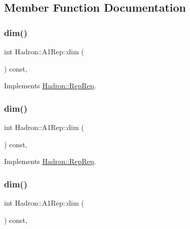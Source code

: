 \subsection{Member Function Documentation}
\mbox{\label{structHadron_1_1A1Rep_a4f7f61f8c9a5113c9407be6609cf7fbe}} 
\subsubsection{\texorpdfstring{dim()}{dim()}\hspace{0.1cm}{\footnotesize\ttfamily [1/5]}}
{\footnotesize\ttfamily int Hadron\+::\+A1\+Rep\+::dim (\begin{DoxyParamCaption}{ }\end{DoxyParamCaption}) const\hspace{0.3cm}{\ttfamily [inline]}, {\ttfamily [virtual]}}



Implements \mbox{\hyperlink{structHadron_1_1RepRep_a92c8802e5ed7afd7da43ccfd5b7cd92b}{Hadron\+::\+Rep\+Rep}}.

\mbox{\label{structHadron_1_1A1Rep_a4f7f61f8c9a5113c9407be6609cf7fbe}} 
\subsubsection{\texorpdfstring{dim()}{dim()}\hspace{0.1cm}{\footnotesize\ttfamily [2/5]}}
{\footnotesize\ttfamily int Hadron\+::\+A1\+Rep\+::dim (\begin{DoxyParamCaption}{ }\end{DoxyParamCaption}) const\hspace{0.3cm}{\ttfamily [inline]}, {\ttfamily [virtual]}}



Implements \mbox{\hyperlink{structHadron_1_1RepRep_a92c8802e5ed7afd7da43ccfd5b7cd92b}{Hadron\+::\+Rep\+Rep}}.

\mbox{\label{structHadron_1_1A1Rep_a4f7f61f8c9a5113c9407be6609cf7fbe}} 
\subsubsection{\texorpdfstring{dim()}{dim()}\hspace{0.1cm}{\footnotesize\ttfamily [3/5]}}
{\footnotesize\ttfamily int Hadron\+::\+A1\+Rep\+::dim (\begin{DoxyParamCaption}{ }\end{DoxyParamCaption}) const\hspace{0.3cm}{\ttfamily [inline]}, {\ttfamily [virtual]}}



